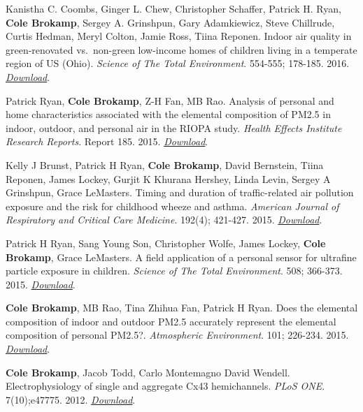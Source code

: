 Kanistha C. Coombs, Ginger L. Chew, Christopher Schaffer, Patrick H.
Ryan, \textbf{Cole Brokamp}, Sergey A. Grinshpun, Gary Adamkiewicz,
Steve Chillrude, Curtis Hedman, Meryl Colton, Jamie Ross, Tiina Reponen.
Indoor air quality in green-renovated vs.~non-green low-income homes of
children living in a temperate region of US (Ohio). \emph{Science of The
Total Environment}. 554-555; 178-185. 2016.
\href{http://colebrokamp-website.s3.amazonaws.com/publications/Coombs_SciTotEnv_2016.pdf}{\emph{Download}}.

Patrick Ryan, \textbf{Cole Brokamp}, Z-H Fan, MB Rao. Analysis of
personal and home characteristics associated with the elemental
composition of PM2.5 in indoor, outdoor, and personal air in the RIOPA
study. \emph{Health Effects Institute Research Reports}. Report 185.
2015.
\href{http://colebrokamp-website.s3.amazonaws.com/publications/Ryan_HEIReport_2015.pdf}{\emph{Download}}.

Kelly J Brunst, Patrick H Ryan, \textbf{Cole Brokamp}, David Bernstein,
Tiina Reponen, James Lockey, Gurjit K Khurana Hershey, Linda Levin,
Sergey A Grinshpun, Grace LeMasters. Timing and duration of
traffic-related air pollution exposure and the risk for childhood wheeze
and asthma. \emph{American Journal of Respiratory and Critical Care
Medicine}. 192(4); 421-427. 2015.
\href{http://colebrokamp-website.s3.amazonaws.com/publications/Brunst_AmJRespCritCareMed_2015.pdf}{\emph{Download}}.

Patrick H Ryan, Sang Young Son, Christopher Wolfe, James Lockey,
\textbf{Cole Brokamp}, Grace LeMasters. A field application of a
personal sensor for ultrafine particle exposure in children.
\emph{Science of The Total Environment}. 508; 366-373. 2015.
\href{http://colebrokamp-website.s3.amazonaws.com/publications/Ryan_SciTotEnv_2015.pdf}{\emph{Download}}.

\textbf{Cole Brokamp}, MB Rao, Tina Zhihua Fan, Patrick H Ryan. Does the
elemental composition of indoor and outdoor PM2.5 accurately represent
the elemental composition of personal PM2.5?. \emph{Atmospheric
Environment}. 101; 226-234. 2015.
\href{http://colebrokamp-website.s3.amazonaws.com/publications/Brokamp_AtmosEnv_2015.pdf}{\emph{Download}}.

\textbf{Cole Brokamp}, Jacob Todd, Carlo Montemagno David Wendell.
Electrophysiology of single and aggregate Cx43 hemichannels. \emph{PLoS
ONE}. 7(10);e47775. 2012.
\href{http://colebrokamp-website.s3.amazonaws.com/publications/Brokamp_PLoSOne_2012.pdf}{\emph{Download}}.

